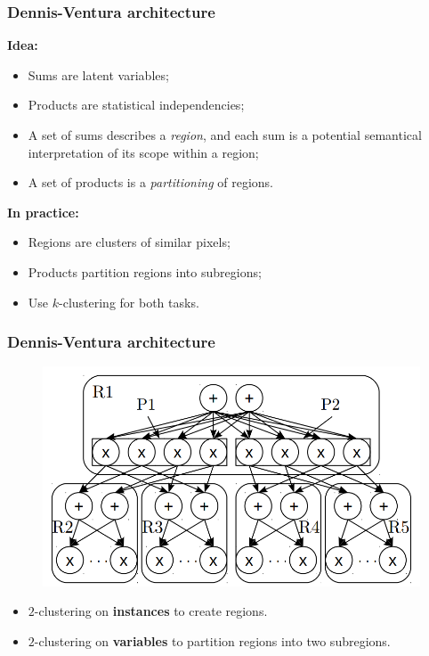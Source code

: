 \documentclass{beamer}
\begin{document}
\begin{frame}
  \frametitle{Dennis-Ventura architecture}

  \textbf{Idea:}\\
  \begin{itemize}
    \item Sums are latent variables;
    \item Products are statistical independencies;
    \item A set of sums describes a \emph{region}, and each sum is a potential semantical
      interpretation of its scope within a region;
    \item A set of products is a \emph{partitioning} of regions.
  \end{itemize}

  \textbf{In practice:}\\
  \begin{itemize}
    \item Regions are clusters of similar pixels;
    \item Products partition regions into subregions;
    \item Use $k$-clustering for both tasks.
  \end{itemize}
\end{frame}

\begin{frame}
  \frametitle{Dennis-Ventura architecture}

  \begin{figure}[h]
    \centering\includegraphics{imgs/trans_dv.png}
    \captionsetup{justification=centering}
    \caption*{\cite{clustering}}
  \end{figure}

  \begin{itemize}
    \item $2$-clustering on \textbf{instances} to create regions.
    \item $2$-clustering on \textbf{variables} to partition regions into two subregions.
  \end{itemize}
\end{frame}
\end{document}
